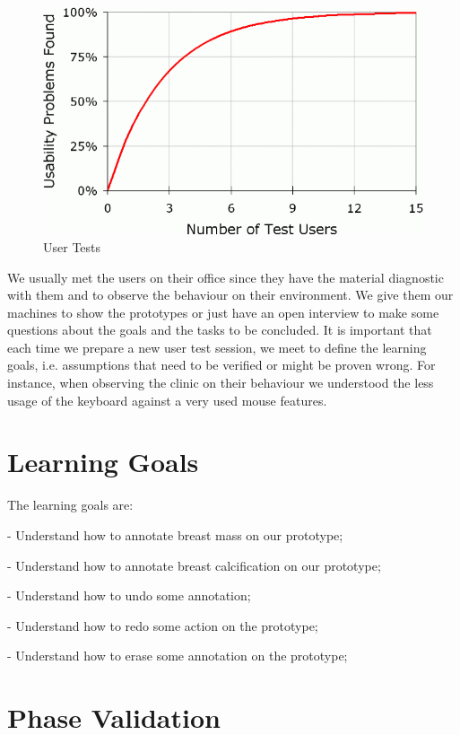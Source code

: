 \begin{figure}[!hbt]
\centering
\includegraphics[width=1.0\textwidth]{number-of-test-users.png}
\caption{\label{fig:frog}User Tests}
\end{figure}

We usually met the users on their office since they have the material diagnostic with them and to observe the behaviour on their environment. We give them our machines to show the prototypes or just have an open interview to make some questions about the goals and the tasks to be concluded. It is important that each time we prepare a new user test session, we meet to define the learning goals, i.e. assumptions that need to be verified or might be proven wrong. For instance, when observing the clinic on their behaviour we understood the less usage of the keyboard against a very used mouse features.

\clearpage

\section{Learning Goals}

The learning goals are:

- Understand how to annotate breast mass on our prototype;

- Understand how to annotate breast calcification on our prototype;

- Understand how to undo some annotation;

- Understand how to redo some action on the prototype;

- Understand how to erase some annotation on the prototype;

\section{Phase Validation}

